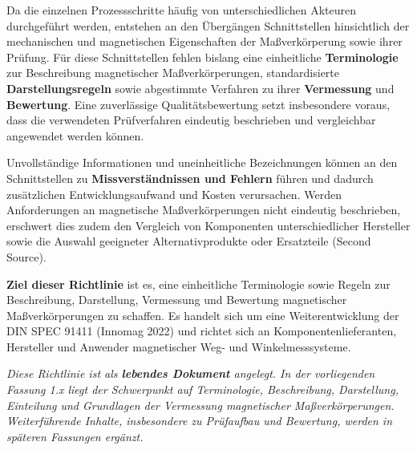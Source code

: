 \documentclass[
  ngerman,
  a4paper,
  twoside]{scrbook}
\newcounter{quartocallouttipno}
\newcommand{\quartocallouttip}[1]{\refstepcounter{quartocallouttipno}\label{#1}}
\begin{document}
Da die einzelnen Prozessschritte häufig von unterschiedlichen Akteuren
durchgeführt werden, entstehen an den Übergängen Schnittstellen
hinsichtlich der mechanischen und magnetischen Eigenschaften der
Maßverkörperung sowie ihrer Prüfung. Für diese Schnittstellen fehlen
bislang eine einheitliche \textbf{Terminologie} zur Beschreibung
magnetischer Maßverkörperungen, standardisierte
\textbf{Darstellungsregeln} sowie abgestimmte Verfahren zu ihrer
\textbf{Vermessung} und \textbf{Bewertung}. Eine zuverlässige
Qualitätsbewertung setzt insbesondere voraus, dass die verwendeten
Prüfverfahren eindeutig beschrieben und vergleichbar angewendet werden
können.

Unvollständige Informationen und uneinheitliche Bezeichnungen können an
den Schnittstellen zu \textbf{Missverständnissen und Fehlern} führen und
dadurch zusätzlichen Entwicklungsaufwand und Kosten verursachen. Werden
Anforderungen an magnetische Maßverkörperungen nicht eindeutig
beschrieben, erschwert dies zudem den Vergleich von Komponenten
unterschiedlicher Hersteller sowie die Auswahl geeigneter
Alternativprodukte oder Ersatzteile (Second Source).

\textbf{Ziel dieser Richtlinie} ist es, eine einheitliche Terminologie
sowie Regeln zur Beschreibung, Darstellung, Vermessung und Bewertung
magnetischer Maßverkörperungen zu schaffen. Es handelt sich um eine
Weiterentwicklung der DIN SPEC 91411 (Innomag 2022) und richtet sich an
Komponentenlieferanten, Hersteller und Anwender magnetischer Weg- und
Winkelmesssysteme.

\begin{tcolorbox}[enhanced jigsaw, arc=.35mm, bottomrule=.15mm, bottomtitle=1mm, breakable, colback=white, colbacktitle=quarto-callout-tip-color!10!white, colframe=quarto-callout-tip-color-frame, coltitle=black, left=2mm, leftrule=.75mm, opacityback=0, opacitybacktitle=0.6, rightrule=.15mm, title=\textcolor{quarto-callout-tip-color}{\faLightbulb}\hspace{0.5em}{Hinweis \ref*{tip-01-lebend}}, titlerule=0mm, toprule=.15mm, toptitle=1mm]

\quartocallouttip{tip-01-lebend} 

\emph{Diese Richtlinie ist als \textbf{lebendes Dokument} angelegt. In
der vorliegenden Fassung 1.x liegt der Schwerpunkt auf Terminologie,
Beschreibung, Darstellung, Einteilung und Grundlagen der Vermessung
magnetischer Maßverkörperungen. Weiterführende Inhalte, insbesondere zu
Prüfaufbau und Bewertung, werden in späteren Fassungen ergänzt.}

\end{tcolorbox}
\end{document}
